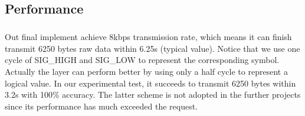 \subsection{Performance}
\subparagraph{}
Out final implement achieve 8kbps transmission rate, which means it can finish transmit 6250 bytes raw data within 6.25s (typical value). Notice that we use one cycle of SIG\_HIGH and SIG\_LOW to represent the corresponding symbol. Actually the layer can perform better by using only a half cycle to represent a logical value. In our experimental test, it succeeds to transmit 6250 bytes within 3.2s with 100\% accuracy. The latter scheme is not adopted in the further projects since its performance has much exceeded the request.



